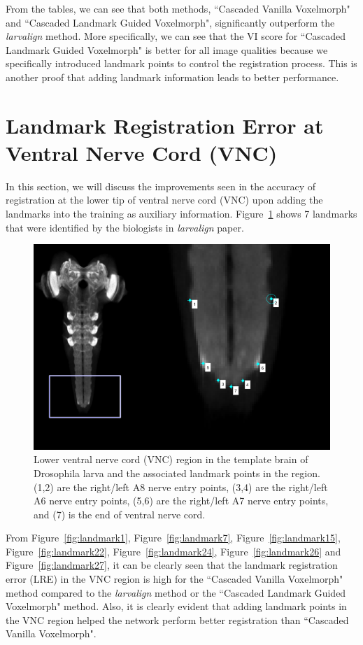 \documentclass{book}
\begin{document}
	From the tables, we can see that both methods, ``Cascaded Vanilla Voxelmorph" and ``Cascaded Landmark Guided Voxelmorph", significantly outperform the \textit{larvalign} method. More specifically, we can see that the VI score for ``Cascaded Landmark Guided Voxelmorph" is better for all image qualities because we specifically introduced landmark points to control the registration process. This is another proof that adding landmark information leads to better performance.
	
	\section{Landmark Registration Error at Ventral Nerve Cord (VNC)}
	In this section, we will discuss the improvements seen in the accuracy of registration at the lower tip of ventral nerve cord (VNC) upon adding the landmarks into the training as auxiliary information. Figure~\ref{fig:vnc} shows 7 landmarks that were identified by the biologists in \textit{larvalign} paper.
	
	\begin{figure}[h!]
		\centering
		\includegraphics[width=0.9\columnwidth]{resources/chapter7/VNC.png}
		\caption{Lower ventral nerve cord (VNC) region in the template brain of Drosophila larva and the associated landmark points in the region. (1,2) are the right/left A8 nerve entry points, (3,4) are the right/left A6 nerve entry points, (5,6) are the right/left A7 nerve entry points, and (7) is the end of ventral nerve cord.}
		\label{fig:vnc}
	\end{figure}
	
	From Figure~\ref{fig:landmark1}, Figure~\ref{fig:landmark7}, Figure~\ref{fig:landmark15}, Figure~\ref{fig:landmark22}, Figure~\ref{fig:landmark24}, Figure~\ref{fig:landmark26} and Figure~\ref{fig:landmark27}, it can be clearly seen that the landmark registration error (LRE) in the VNC region is high for the ``Cascaded Vanilla Voxelmorph" method compared to the \textit{larvalign} method or the ``Cascaded Landmark Guided Voxelmorph" method. Also, it is clearly evident that adding landmark points in the VNC region helped the network perform better registration than ``Cascaded Vanilla Voxelmorph".
	
\end{document}

